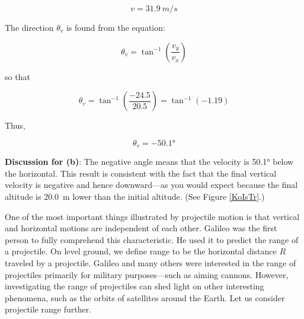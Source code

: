 \documentclass[../../main-ap-physics.tex]{subfiles}
\begin{document}
\begin{equation*}
    v = \SI{31.9}{m/s}
\end{equation*}

The direction $\theta_v$ is found from the equation:

\begin{equation*}
    \theta_v = \tan^{-1} \left(\frac{v_y}{v_x}\right)
\end{equation*}

so that

\begin{equation*}
    \theta_v = \tan^{-1} \left(\frac{-24.5}{20.5}\right) = \tan^{-1} (-1.19)
\end{equation*}

Thus,

\begin{equation*}
    \theta_v = \ang{-50.1}
\end{equation*}

\textbf{Discussion for (b)}: The negative angle means that the velocity is \ang{50.1} below the horizontal. This result is consistent with the fact that the final vertical velocity is negative and hence downward---as you would expect because the final altitude is \SI{20.0}{m} lower than the initial altitude. (See Figure \ref{KoIsTr}.)

\endsolution

One of the most important things illustrated by projectile motion is that vertical and horizontal motions are independent of each other. Galileo was the first person to fully comprehend this characteristic. He used it to predict the range of a projectile. On level ground, we define \gls{range} to be the horizontal distance $R$ traveled by a projectile. Galileo and many others were interested in the range of projectiles primarily for military purposes---such as aiming cannons. However, investigating the range of projectiles can shed light on other interesting phenomena, such as the orbits of satellites around the Earth. Let us consider projectile range further.
\end{document}
